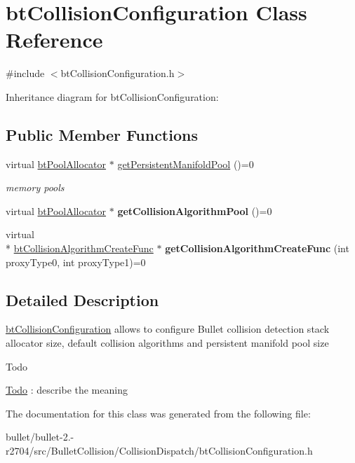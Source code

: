 \hypertarget{classbt_collision_configuration}{\section{bt\+Collision\+Configuration Class Reference}
\label{classbt_collision_configuration}
}


{\ttfamily \#include $<$bt\+Collision\+Configuration.\+h$>$}



Inheritance diagram for bt\+Collision\+Configuration\+:
\subsection*{Public Member Functions}
\begin{DoxyCompactItemize}
\item 
\hypertarget{classbt_collision_configuration_a0885a7c5ff597994cade5b1a495edfa2}{virtual \hyperlink{classbt_pool_allocator}{bt\+Pool\+Allocator} $\ast$ \hyperlink{classbt_collision_configuration_a0885a7c5ff597994cade5b1a495edfa2}{get\+Persistent\+Manifold\+Pool} ()=0}\label{classbt_collision_configuration_a0885a7c5ff597994cade5b1a495edfa2}

\begin{DoxyCompactList}\small\item\em memory pools \end{DoxyCompactList}\item 
\hypertarget{classbt_collision_configuration_ad518b5518f3146593f6ea005e9514f09}{virtual \hyperlink{classbt_pool_allocator}{bt\+Pool\+Allocator} $\ast$ {\bfseries get\+Collision\+Algorithm\+Pool} ()=0}\label{classbt_collision_configuration_ad518b5518f3146593f6ea005e9514f09}

\item 
\hypertarget{classbt_collision_configuration_acb52a540206ad48d7748b7f2e06bf94e}{virtual \\*
\hyperlink{structbt_collision_algorithm_create_func}{bt\+Collision\+Algorithm\+Create\+Func} $\ast$ {\bfseries get\+Collision\+Algorithm\+Create\+Func} (int proxy\+Type0, int proxy\+Type1)=0}\label{classbt_collision_configuration_acb52a540206ad48d7748b7f2e06bf94e}

\end{DoxyCompactItemize}


\subsection{Detailed Description}
\hyperlink{classbt_collision_configuration}{bt\+Collision\+Configuration} allows to configure Bullet collision detection stack allocator size, default collision algorithms and persistent manifold pool size \begin{DoxyRefDesc}{Todo}
\item[\hyperlink{todo__todo000019}{Todo}]\+: describe the meaning \end{DoxyRefDesc}


The documentation for this class was generated from the following file\+:\begin{DoxyCompactItemize}
\item 
bullet/bullet-\/2.-\/r2704/src/\+Bullet\+Collision/\+Collision\+Dispatch/bt\+Collision\+Configuration.\+h\end{DoxyCompactItemize}
